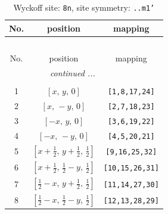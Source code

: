 \documentclass[fleqn,8pt]{jsarticle}
\begin{document}
\begin{longtable}{ccc}
\caption{Wyckoff site: {\tt 8n}, site symmetry: {\tt ..m1'}}
 \\
 \hline \hline
No. & position & mapping \\ \hline \endfirsthead

\multicolumn{2}{l}{\tablename\ \thetable{}} \\
 \hline \hline
No. & position & mapping \\ \hline \endhead

 \hline \hline
\multicolumn{2}{r}{\footnotesize\it continued ...} \\ \endfoot

 \hline \hline
\multicolumn{2}{r}{} \\ \endlastfoot

1 & $\left[ x,\, y,\, 0 \right]$ & {\tt [1,8,17,24]} \\ \hline
2 & $\left[ x,\, - y,\, 0 \right]$ & {\tt [2,7,18,23]} \\ \hline
3 & $\left[ - x,\, y,\, 0 \right]$ & {\tt [3,6,19,22]} \\ \hline
4 & $\left[ - x,\, - y,\, 0 \right]$ & {\tt [4,5,20,21]} \\ \hline
5 & $\left[ x + \frac{1}{2},\, y + \frac{1}{2},\, \frac{1}{2} \right]$ & {\tt [9,16,25,32]} \\ \hline
6 & $\left[ x + \frac{1}{2},\, \frac{1}{2} - y,\, \frac{1}{2} \right]$ & {\tt [10,15,26,31]} \\ \hline
7 & $\left[ \frac{1}{2} - x,\, y + \frac{1}{2},\, \frac{1}{2} \right]$ & {\tt [11,14,27,30]} \\ \hline
8 & $\left[ \frac{1}{2} - x,\, \frac{1}{2} - y,\, \frac{1}{2} \right]$ & {\tt [12,13,28,29]} \\
\end{longtable}
\renewcommand{\arraystretch}{1.2}
\end{document}
